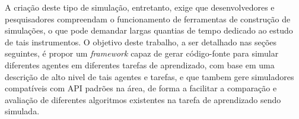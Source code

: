 \documentclass[cic,tc]{iiufrgs}
\newcommand\bruno[1]{\textcolor{magenta}{#1}}
\begin{document}
A criação deste tipo de simulação, entretanto, exige que desenvolvedores e pesquisadores compreendam o funcionamento de ferramentas de construção
de simulações, o que pode demandar largas quantias de tempo dedicado ao estudo de tais instrumentos. O objetivo deste trabalho, a ser detalhado
nas seções seguintes, é propor um \textit{framework} capaz de gerar código-fonte para simular diferentes agentes em diferentes tarefas de aprendizado,
com base em uma descrição de alto nivel de tais agentes e tarefas, e que tambem gere simuladores compatíveis com API padrões na área, de forma a facilitar
a comparação e avaliação de diferentes algoritmos existentes na tarefa de aprendizado sendo simulada.
%
\end{document}
